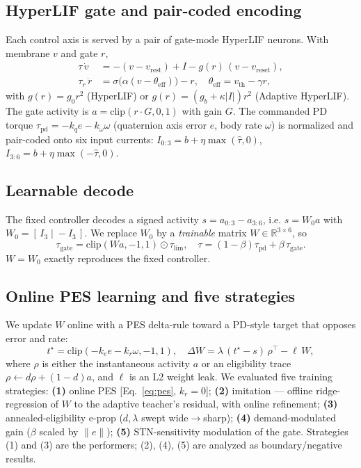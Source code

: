 \documentclass[conference]{IEEEtran}
\begin{document}
\subsection{HyperLIF gate and pair-coded encoding}
Each control axis is served by a pair of gate-mode HyperLIF neurons. With
membrane $v$ and gate $r$,
\begin{align}
  \tau\,\dot v &= -(v-v_\mathrm{rest}) + I - g(r)\,(v-v_\mathrm{reset}),\\
  \tau_r\,\dot r &= \sigma\!\big(\alpha(v-\theta_\mathrm{eff})\big) - r,\quad
  \theta_\mathrm{eff}=v_\mathrm{th}-\gamma r,
\end{align}
with $g(r)=g_0 r^2$ (HyperLIF) or $g(r)=(g_b+\kappa|I|)r^2$ (Adaptive HyperLIF).
The gate activity is $a=\mathrm{clip}(r\cdot G,0,1)$ with gain $G$. The commanded
PD torque $\tau_\mathrm{pd}=-k_q e - k_\omega \omega$ (quaternion axis error $e$,
body rate $\omega$) is normalized and pair-coded onto six input currents:
$I_{0:3}=b+\eta\max(\hat\tau,0)$, $I_{3:6}=b+\eta\max(-\hat\tau,0)$.

\subsection{Learnable decode}
The fixed controller decodes a signed activity $s=a_{0:3}-a_{3:6}$, i.e.
$s=W_0 a$ with $W_0=[\,I_3\;|\;-I_3\,]$. We replace $W_0$ by a \emph{trainable}
matrix $W\in\mathbb{R}^{3\times6}$, so
\begin{equation}
  \tau_\mathrm{gate}=\mathrm{clip}(Wa,-1,1)\odot\tau_\mathrm{lim},\quad
  \tau=(1-\beta)\tau_\mathrm{pd}+\beta\,\tau_\mathrm{gate}.
\end{equation}
$W\!=\!W_0$ exactly reproduces the fixed controller.

\subsection{Online PES learning and five strategies}\label{sec:learn}
We update $W$ online with a PES delta-rule toward a PD-style target that opposes
error and rate:
\begin{equation}
  t^\star=\mathrm{clip}(-k_e e-k_r\omega,-1,1),\quad
  \Delta W=\lambda\,(t^\star-s)\,\rho^{\!\top}-\ell\,W,
  \label{eq:pes}
\end{equation}
where $\rho$ is either the instantaneous activity $a$ or an eligibility trace
$\rho\leftarrow d\rho+(1-d)a$, and $\ell$ is an L2 weight leak. We evaluated five
training strategies: \textbf{(1)} online PES [Eq.~\ref{eq:pes}, $k_r{=}0$];
\textbf{(2)} imitation --- offline ridge-regression of $W$ to the adaptive
teacher's residual, with online refinement; \textbf{(3)} annealed-eligibility
e-prop ($d,\lambda$ swept wide$\rightarrow$sharp); \textbf{(4)} demand-modulated
gain ($\beta$ scaled by $\|e\|$); \textbf{(5)} STN-sensitivity modulation of the
gate. Strategies (1) and (3) are the performers; (2), (4), (5) are analyzed as
boundary/negative results.
\end{document}
